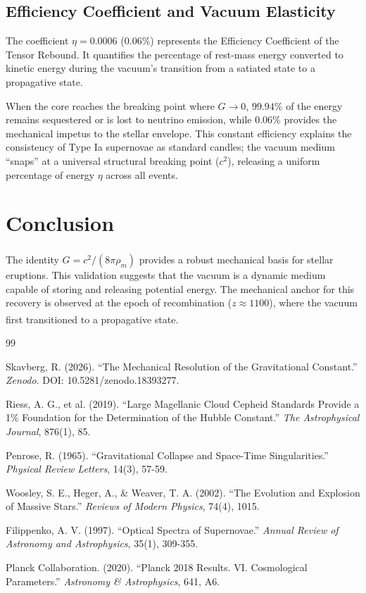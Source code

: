 \documentclass[11pt,a4paper,oneside]{article}
\newcommand{\citeS}[1]{\textsuperscript{\cite{#1}}}
\begin{document}
\subsection{Efficiency Coefficient and Vacuum Elasticity}
The coefficient $\eta = 0.0006$ ($0.06\%$) represents the Efficiency Coefficient of the Tensor Rebound. It quantifies the percentage of rest-mass energy converted to kinetic energy during the vacuum's transition from a satiated state to a propagative state. 

When the core reaches the breaking point where $G \to 0$, $99.94\%$ of the energy remains sequestered or is lost to neutrino emission, while $0.06\%$ provides the mechanical impetus to the stellar envelope. This constant efficiency explains the consistency of Type Ia supernovae as standard candles; the vacuum medium ``snaps'' at a universal structural breaking point ($c^2$), releasing a uniform percentage of energy $\eta$ across all events.

\section{Conclusion}
The identity $G = c^2 / (8\pi\rho_m)$\citeS{Skavberg2026} provides a robust mechanical basis for stellar eruptions. This validation suggests that the vacuum is a dynamic medium capable of storing and releasing potential energy. The mechanical anchor for this recovery is observed at the epoch of recombination ($z \approx 1100$), where the vacuum first transitioned to a propagative state\citeS{Planck2018}.

\begin{thebibliography}{99}

Skavberg, R. (2026). ``The Mechanical Resolution of the Gravitational Constant.'' \textit{Zenodo}. DOI: 10.5281/zenodo.18393277.

Riess, A. G., et al. (2019). ``Large Magellanic Cloud Cepheid Standards Provide a 1\% Foundation for the Determination of the Hubble Constant.'' \textit{The Astrophysical Journal}, 876(1), 85.

Penrose, R. (1965). ``Gravitational Collapse and Space-Time Singularities.'' \textit{Physical Review Letters}, 14(3), 57-59.

Woosley, S. E., Heger, A., \& Weaver, T. A. (2002). ``The Evolution and Explosion of Massive Stars.'' \textit{Reviews of Modern Physics}, 74(4), 1015.

Filippenko, A. V. (1997). ``Optical Spectra of Supernovae.'' \textit{Annual Review of Astronomy and Astrophysics}, 35(1), 309-355.

Planck Collaboration. (2020). ``Planck 2018 Results. VI. Cosmological Parameters.'' \textit{Astronomy \& Astrophysics}, 641, A6.

\end{thebibliography}
\end{document}
